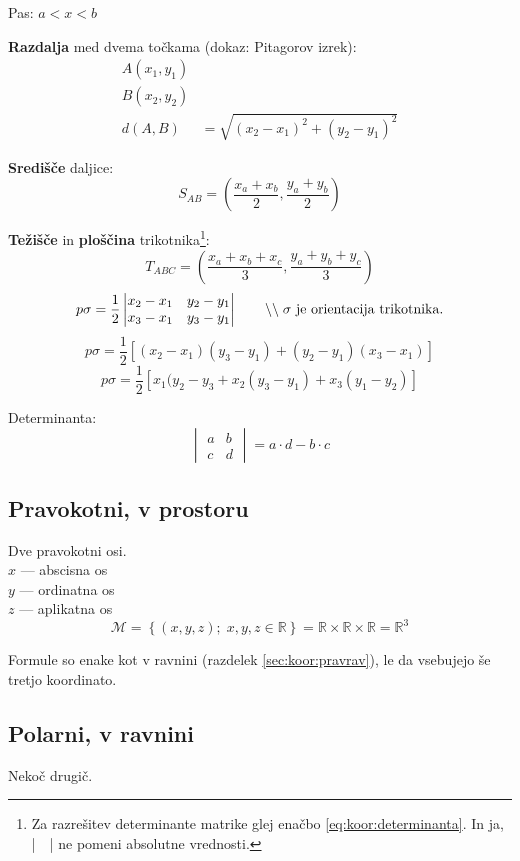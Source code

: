 \documentclass[a4paper,oneside,12pt,fleqn]{article}
\def\R{\ensuremath{\mathbb R}}
\newcommand\krat\cdot
\newcommand{\comment}[1]{\ensuremath{\qquad\backslash\backslash\;}\textnormal{#1}}
\numberwithin{equation}{section}
\begin{document}
Pas: $a < x < b$ 

\textbf{Razdalja} med dvema točkama (dokaz: Pitagorov izrek):
\begin{align*}
  A(x_1, y_1) \\
  B(x_2, y_2) \\
  d(A,B) &= \sqrt{\left( x_2 - x_1 \right)^2 + \left( y_2 - y_1 \right)^2}
\end{align*}

\textbf{Središče} daljice:
\[ S_{AB} = \left( \frac{x_a+x_b}{2}, \frac{y_a+y_b}{2} \right) \]

\textbf{Težišče} in \textbf{ploščina} trikotnika\footnote{Za razrešitev
determinante matrike glej enačbo \eqref{eq:koor:determinanta}. In ja, |\ \ | ne pomeni absolutne
vrednosti.}:
\[ T_{ABC} = \left( \frac{x_a+x_b+x_c}{3},\frac{y_a+y_b+y_c}{3} \right) \]
\[ p\sigma = \frac{1}{2} \begin{vmatrix}
    x_2 - x_1 & y_2 - y_1 \\
    x_3 - x_1 & y_3 - y_1 
\end{vmatrix} \comment{$\sigma$ je orientacija trikotnika.} \]
\[ p\sigma = \frac{1}{2} \left[ (x_2-x_1)(y_3-y_1) + (y_2-y_1)(x_3-x_1) \right] \]
\[ p\sigma = \frac{1}{2} \left[ x_1(y_2-y_3 + x_2(y_3-y_1) + x_3(y_1-y_2) \right] \]

Determinanta:
\begin{equation}
  \begin{vmatrix}
    a & b \\
    c & d
  \end{vmatrix} = a \krat d - b \krat c
  \label{eq:koor:determinanta}
\end{equation}

\subsection{Pravokotni, v prostoru}
\label{sec:koor:pravpro}
Dve pravokotni osi. \\
$x$ --- abscisna os \\
$y$ --- ordinatna os \\
$z$ --- aplikatna os
\[ \mathcal{M} = \left\{ (x,y,z); \; x, y, z \in \R \right\} = \R \times \R \times \R = \R^3 \]

Formule so enake kot v ravnini (razdelek \ref{sec:koor:pravrav}), le da vsebujejo še
tretjo koordinato.

\subsection{Polarni, v ravnini}
\label{sec:koor:pol}
Nekoč drugič.
\end{document}
